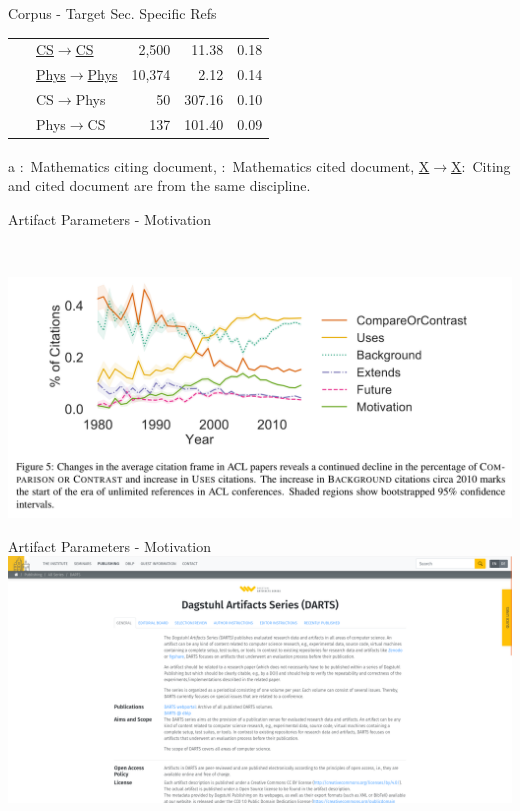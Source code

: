 \documentclass[en,16:9,smallfoot]{sdqbeamer}
\begin{document}
\begin{frame}{Corpus - Target Sec. Specific Refs}
\begin{table}
\begin{scriptsize}
\begin{threeparttable}
\begin{tabular}{llrrr}
       \ & \underline{CS$\rightarrow$CS} & 2,500 & 11.38 & 0.18 \\ %
       \ & \underline{Phys$\rightarrow$Phys} & 10,374 & 2.12 & 0.14 \\ %
       \ & CS$\rightarrow$Phys & 50 & 307.16 & 0.10 \\ %
       \ & Phys$\rightarrow$CS & 137 & 101.40 & 0.09  \\ %
      \bottomrule
    \end{tabular}
     \begin{tablenotes}
        \item[a] {\color{contextgrey}\textsuperscript{\textdagger}:~Mathematics citing document, \textsuperscript{\textdaggerdbl}:~Mathematics cited document, \underline{X$\rightarrow$X}:~Citing and cited document are from the same discipline.}
      \end{tablenotes}
     \end{threeparttable}
    \end{scriptsize}
    \end{table}
   \end{frame}

   \begin{frame}{Artifact Parameters - Motivation}
    \begin{scriptsize}
    \\
    \end{scriptsize}

    \centering
    \includegraphics[width=.7\textwidth]{imgs/use_on_the_rise}
   \end{frame}

   \begin{frame}{Artifact Parameters - Motivation}
    \centering
    \includegraphics[width=.8\textwidth]{imgs/darts_website}
   \end{frame}
\end{document}
